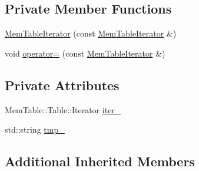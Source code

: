 \subsection*{Private Member Functions}
\begin{DoxyCompactItemize}
\item 
\hyperlink{classleveldb_1_1_mem_table_iterator_a7b539ae73a0d99580fdf1eb30f8c0181}{Mem\-Table\-Iterator} (const \hyperlink{classleveldb_1_1_mem_table_iterator}{Mem\-Table\-Iterator} \&)
\item 
void \hyperlink{classleveldb_1_1_mem_table_iterator_a4914bfee3ed31bca598ffcc201d994f4}{operator=} (const \hyperlink{classleveldb_1_1_mem_table_iterator}{Mem\-Table\-Iterator} \&)
\end{DoxyCompactItemize}
\subsection*{Private Attributes}
\begin{DoxyCompactItemize}
\item 
Mem\-Table\-::\-Table\-::\-Iterator \hyperlink{classleveldb_1_1_mem_table_iterator_af86e4d25dc6409af1b670eb89110ea89}{iter\-\_\-}
\item 
std\-::string \hyperlink{classleveldb_1_1_mem_table_iterator_a2f53089f1ea63c06c3719a4bce50a076}{tmp\-\_\-}
\end{DoxyCompactItemize}
\subsection*{Additional Inherited Members}


